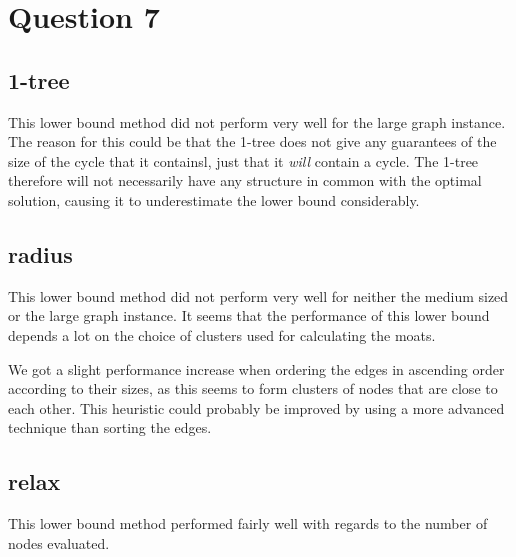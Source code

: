 \documentclass[a4paper, 10pt, oneside, article]{memoir}
\begin{document}
\section*{Question 7}

\subsection{1-tree}

This lower bound method did not perform very well for the large graph
instance. The reason for this could be that the 1-tree does not give
any guarantees of the size of the cycle that it containsl, just that
it \emph{will} contain a cycle. The 1-tree therefore will not
necessarily have any structure in common with the optimal solution,
causing it to underestimate the lower bound considerably.


\subsection{radius}

This lower bound method did not perform very well for neither the
medium sized or the large graph instance. It seems that the
performance of this lower bound depends a lot on the choice of
clusters used for calculating the moats.

We got a slight performance increase when ordering the edges in
ascending order according to their sizes, as this seems to form
clusters of nodes that are close to each other. This heuristic could
probably be improved by using a more advanced technique than sorting
the edges.


\subsection{relax}

This lower bound method performed fairly well with regards to the
number of nodes evaluated.




\end{document}
